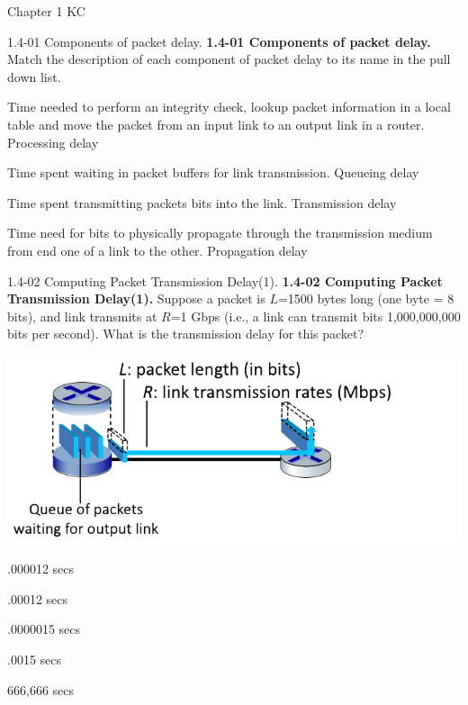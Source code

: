 \documentclass[a4paper]{article}
\begin{document}
\begin{quiz}{Chapter 1 KC}
\begin{matching}[points=1,shuffle=true]{1.4-01 Components of packet delay.}
\textbf{1.4-01 Components of packet delay.}
Match the description of each component of packet delay to its name in the pull down list.

\item Time needed to perform an integrity check, lookup packet information in a local table and move the packet from an input link to an output link in a router. \answer Processing delay
\item Time spent waiting in packet buffers for link transmission. \answer Queueing delay
\item Time spent transmitting packets bits into the link. \answer Transmission delay
\item Time need for bits to physically propagate through the transmission medium from end one of a link to the other. \answer Propagation delay
\end{matching}


\begin{multi}[points=1,shuffle=true]{1.4-02 Computing Packet Transmission Delay(1).}
\textbf{1.4-02 Computing Packet Transmission Delay(1).} 
Suppose a packet is $L$=1500 bytes long (one byte = 8 bits), and link transmits at $R$=1 Gbps (i.e., a link can transmit bits 1,000,000,000 bits per second).  
What is the transmission delay for this packet?
\begin{center}
\includegraphics[width=\linewidth]{figs/1.4.2.png}
\end{center}
\item* .000012 secs
\item .00012 secs
\item .0000015 secs
\item .0015 secs
\item 666,666 secs
\end{multi}


\end{quiz}
\end{document}
